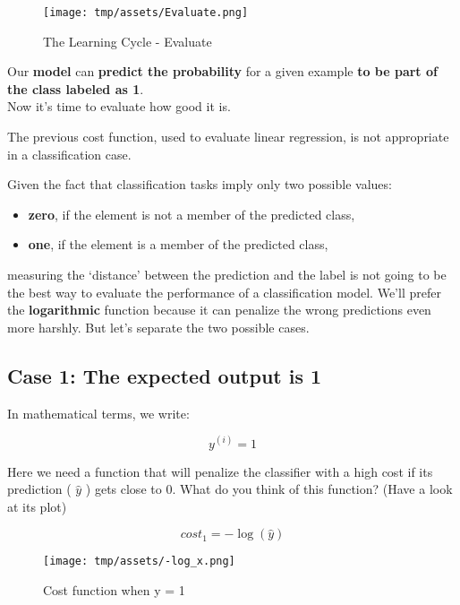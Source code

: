 \documentclass[]{article}
\begin{document}
\begin{figure}
\centering
\texttt{[image: tmp/assets/Evaluate.png]}
\caption{The Learning Cycle - Evaluate}
\end{figure}

Our \textbf{model} can \textbf{predict the probability} for a given
example \textbf{to be part of the class labeled as 1}.\\
Now it's time to evaluate how good it is.

The previous cost function, used to evaluate linear regression, is not
appropriate in a classification case.

Given the fact that classification tasks imply only two possible values:

\begin{itemize}
\item
  \textbf{zero}, if the element is not a member of the predicted class,
\item
  \textbf{one}, if the element is a member of the predicted class,
\end{itemize}

measuring the `distance' between the prediction and the label is not
going to be the best way to evaluate the performance of a classification
model. We'll prefer the \textbf{logarithmic} function because it can
penalize the wrong predictions even more harshly. But let's separate the
two possible cases.

\hypertarget{case-1-the-expected-output-is-1}{%
\subsection{Case 1: The expected output is
1}\label{case-1-the-expected-output-is-1}}

In mathematical terms, we write:

\large

\[
y^{(i)} = 1
\] \normalsize

Here we need a function that will penalize the classifier with a high
cost if its prediction ( \(\hat{y}\) ) gets close to \(0\). What do you
think of this function? (Have a look at its plot)

\large

\[
cost_1 = -\log(\hat{y})
\] \normalsize

\newpage

\begin{figure}
\centering
\texttt{[image: tmp/assets/-log\_x.png]}
\caption{Cost function when y = 1}
\end{figure}
\end{document}

